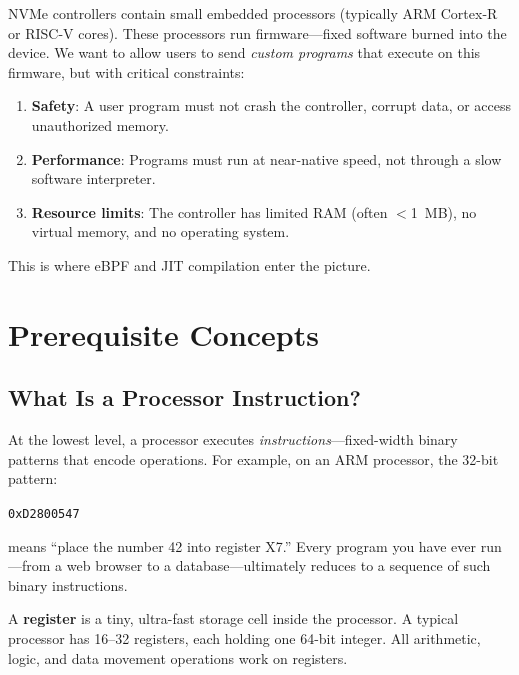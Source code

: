\documentclass[11pt,letterpaper]{article}
\begin{document}
NVMe controllers contain small embedded processors (typically ARM Cortex-R or RISC-V cores). These processors run firmware---fixed software burned into the device. We want to allow users to send \emph{custom programs} that execute on this firmware, but with critical constraints:

\begin{enumerate}[label=(\arabic*)]
    \item \textbf{Safety}: A user program must not crash the controller, corrupt data, or access unauthorized memory.
    \item \textbf{Performance}: Programs must run at near-native speed, not through a slow software interpreter.
    \item \textbf{Resource limits}: The controller has limited RAM (often $<$1~MB), no virtual memory, and no operating system.
\end{enumerate}

This is where eBPF and JIT compilation enter the picture.

\section{Prerequisite Concepts}

\subsection{What Is a Processor Instruction?}

At the lowest level, a processor executes \emph{instructions}---fixed-width binary patterns that encode operations. For example, on an ARM processor, the 32-bit pattern:

\begin{center}
\texttt{0xD2800547}
\end{center}

\noindent means ``place the number 42 into register X7.'' Every program you have ever run---from a web browser to a database---ultimately reduces to a sequence of such binary instructions.

\begin{definition}
A \textbf{register} is a tiny, ultra-fast storage cell inside the processor. A typical processor has 16--32 registers, each holding one 64-bit integer. All arithmetic, logic, and data movement operations work on registers.
\end{definition}
\end{document}
